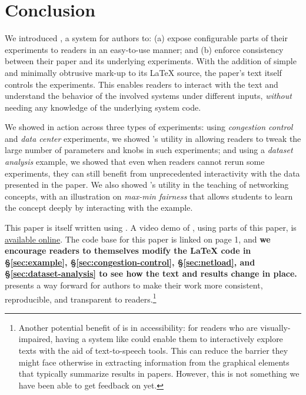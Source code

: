 \section{Conclusion}
\label{sec:conclusion}

We introduced \sysname, a system for authors to: (a) expose configurable parts of their experiments to readers in an easy-to-use manner; and (b) enforce consistency between their paper and its underlying experiments. With the addition of simple and minimally obtrusive mark-up to its \LaTeX{} source, the paper's text itself controls the experiments. This enables readers to interact with the text and understand the behavior of the involved systems under different inputs, \textit{without} needing any knowledge of the underlying system code. 

We showed \sysname in action across three types of experiments: using \textit{congestion control} and \textit{data center} experiments, we showed \sysname's utility in allowing readers to tweak the large number of parameters and knobs in such experiments; and using a \textit{dataset analysis} example, we showed that even when readers cannot rerun some experiments, they can still benefit from unprecedented interactivity with the data presented in the paper. We also showed \sysname's utility in the teaching of networking concepts, with an illustration on \textit{max-min fairness} that allows students to learn the concept deeply by interacting with the example.

This paper is itself written using \sysname. A video demo of \sysname, using parts of this paper, is \href{https://drive.google.com/file/d/1U_3MxQ84FaE8fkTME6MF_SFuZIRhzTnv/view}{available online}. The code base for this paper is linked on page 1, and \textbf{we encourage readers to themselves modify the \LaTeX{} code in \S\ref{sec:example}, \S\ref{sec:congestion-control}, \S\ref{sec:netload}, and \S\ref{sec:dataset-analysis} to see how the text and results change in place.} \sysname presents a way forward for authors to make their work more consistent, reproducible, and transparent to readers.\footnote{Another potential benefit of \sysname is in accessibility: for readers who are visually-impaired, having a system like \sysname could enable them to interactively explore texts with the aid of text-to-speech tools. This can reduce the barrier they might face otherwise in extracting information from the graphical elements that typically summarize results in papers. However, this is not something we have been able to get feedback on yet.}
